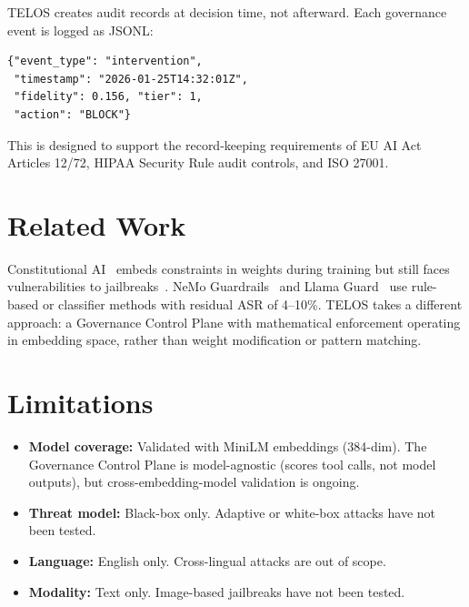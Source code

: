 \documentclass[11pt,twocolumn]{article}
\begin{document}
TELOS creates audit records at decision time, not afterward. Each governance event is logged as JSONL:

\begin{lstlisting}
{"event_type": "intervention",
 "timestamp": "2026-01-25T14:32:01Z",
 "fidelity": 0.156, "tier": 1,
 "action": "BLOCK"}
\end{lstlisting}

This is designed to support the record-keeping requirements of EU AI Act Articles 12/72, HIPAA Security Rule audit controls, and ISO 27001.

\section{Related Work}

Constitutional AI~\citep{bai2022constitutional} embeds constraints in weights during training but still faces vulnerabilities to jailbreaks~\citep{wei2023jailbroken}. NeMo Guardrails~\citep{rebedea2023nemo} and Llama Guard~\citep{inan2023llamaguard} use rule-based or classifier methods with residual ASR of 4--10\%. TELOS takes a different approach: a Governance Control Plane with mathematical enforcement operating in embedding space, rather than weight modification or pattern matching.

\section{Limitations}

\begin{itemize}
    \item \textbf{Model coverage:} Validated with MiniLM embeddings (384-dim). The Governance Control Plane is model-agnostic (scores tool calls, not model outputs), but cross-embedding-model validation is ongoing.
    \item \textbf{Threat model:} Black-box only. Adaptive or white-box attacks have not been tested.
    \item \textbf{Language:} English only. Cross-lingual attacks are out of scope.
    \item \textbf{Modality:} Text only. Image-based jailbreaks have not been tested.
\end{itemize}
\end{document}
